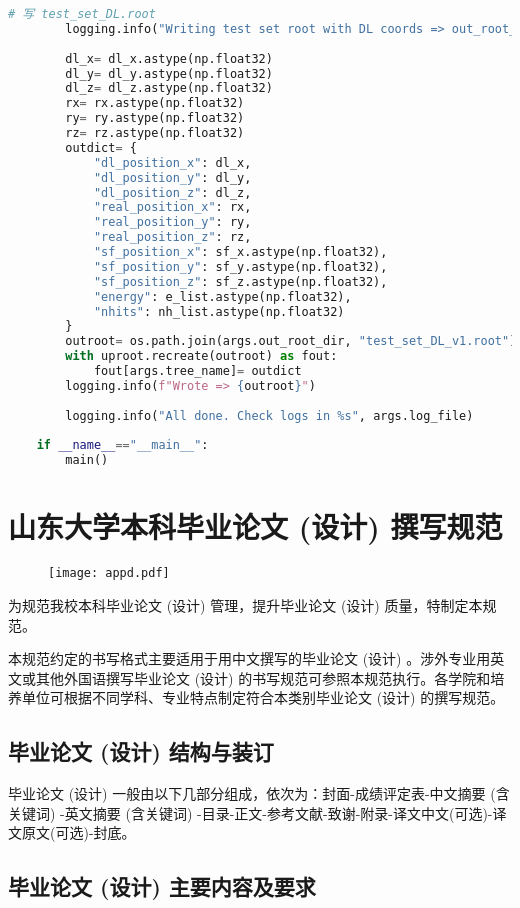 \begin{lstlisting}[language=Python, caption={模型训练、验证与测试对比脚本 (train\_val\_test\_compare\_v1.py)}, label={lst:train_script}]
        # 写 test_set_DL.root
        logging.info("Writing test set root with DL coords => out_root_dir")
    
        dl_x= dl_x.astype(np.float32)
        dl_y= dl_y.astype(np.float32)
        dl_z= dl_z.astype(np.float32)
        rx= rx.astype(np.float32)
        ry= ry.astype(np.float32)
        rz= rz.astype(np.float32)
        outdict= {
            "dl_position_x": dl_x,
            "dl_position_y": dl_y,
            "dl_position_z": dl_z,
            "real_position_x": rx,
            "real_position_y": ry,
            "real_position_z": rz,
            "sf_position_x": sf_x.astype(np.float32),
            "sf_position_y": sf_y.astype(np.float32),
            "sf_position_z": sf_z.astype(np.float32),
            "energy": e_list.astype(np.float32),
            "nhits": nh_list.astype(np.float32)
        }
        outroot= os.path.join(args.out_root_dir, "test_set_DL_v1.root")
        with uproot.recreate(outroot) as fout:
            fout[args.tree_name]= outdict
        logging.info(f"Wrote => {outroot}")
    
        logging.info("All done. Check logs in %s", args.log_file)
    
    if __name__=="__main__":
        main()
\end{lstlisting}

\chapter{山东大学本科毕业论文 (设计) 撰写规范}

\begin{figure}[htbp]
\centering
\texttt{[image: appd.pdf]}
\end{figure}
为规范我校本科毕业论文 (设计) 管理，提升毕业论文 (设计) 质量，特制定本规范。

本规范约定的书写格式主要适用于用中文撰写的毕业论文 (设计) 。涉外专业用英文或其他外国语撰写毕业论文 (设计) 的书写规范可参照本规范执行。各学院和培养单位可根据不同学科、专业特点制定符合本类别毕业论文 (设计) 的撰写规范。
\section{毕业论文 (设计) 结构与装订}
毕业论文 (设计) 一般由以下几部分组成，依次为：封面-成绩评定表-中文摘要 (含关键词) -英文摘要 (含关键词) -目录-正文-参考文献-致谢-附录-译文中文(可选)-译文原文(可选)-封底。
\section{毕业论文 (设计) 主要内容及要求}

